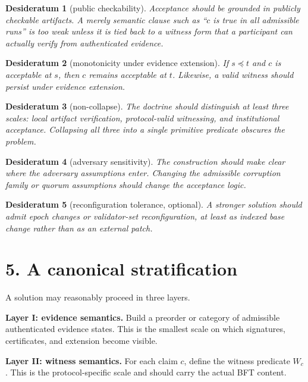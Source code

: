 \documentclass[11pt]{article}
\newtheorem{desideratum}{Desideratum}
\begin{document}
\begin{desideratum}[public checkability]
Acceptance should be grounded in \emph{publicly checkable} artifacts. A merely semantic clause such as ``$c$ is true in all admissible runs'' is too weak unless it is tied back to a witness form that a participant can actually verify from authenticated evidence.
\end{desideratum}

\begin{desideratum}[monotonicity under evidence extension]
If $s\preceq t$ and $c$ is acceptable at $s$, then $c$ remains acceptable at $t$. Likewise, a valid witness should persist under evidence extension.
\end{desideratum}

\begin{desideratum}[non-collapse]
The doctrine should distinguish at least three scales: local artifact verification, protocol-valid witnessing, and institutional acceptance. Collapsing all three into a single primitive predicate obscures the problem.
\end{desideratum}

\begin{desideratum}[adversary sensitivity]
The construction should make clear where the adversary assumptions enter. Changing the admissible corruption family or quorum assumptions should change the acceptance logic.
\end{desideratum}

\begin{desideratum}[reconfiguration tolerance, optional]
A stronger solution should admit epoch changes or validator-set reconfiguration, at least as indexed base change rather than as an external patch.
\end{desideratum}

\section*{5. A canonical stratification}
A solution may reasonably proceed in three layers.

\textbf{Layer I: evidence semantics.} Build a preorder or category of admissible authenticated evidence states. This is the smallest scale on which signatures, certificates, and extension become visible.

\textbf{Layer II: witness semantics.} For each claim $c$, define the witness predicate $W_c$. This is the protocol-specific scale and should carry the actual BFT content.
\end{document}
